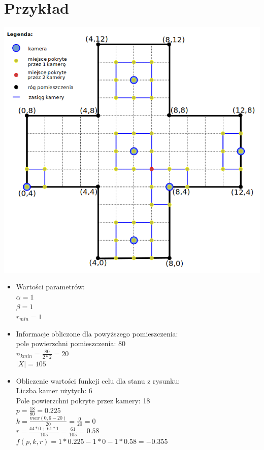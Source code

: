 \documentclass[12pt,a4paper]{article}
\begin{document}
\section{Przykład}
\begin{center}
	\includegraphics[scale=0.6]{img/example.png}
\end{center}


\begin{itemize}
	\item Wartości parametrów:\\
	$\alpha = 1$\\
	$\beta = 1$\\
	$r_{min} = 1$
	\item Informacje obliczone dla powyższego pomieszczenia:\\
	pole powierzchni pomieszczenia: 80\\
	$n_{kmin} = \frac{80}{2*2} = 20$\\
	$|X| = 105$
	\item Obliczenie wartości funkcji celu dla stanu z rysunku:\\
	Liczba kamer użytych: 6\\
	Pole powierzchni pokryte przez kamery: 18\\
	$p = \frac{18}{80} = 0.225$\\
	$k = \frac{max(0, 6-20)}{20} = \frac{0}{20} = 0$\\
	$r = \frac{44*0 + 61*1}{105} = \frac{61}{105} = 0.58$\\
	$f(p, k, r) = 1*0.225 - 1*0 - 1*0.58 = -0.355$
\end{itemize}
\end{document}
